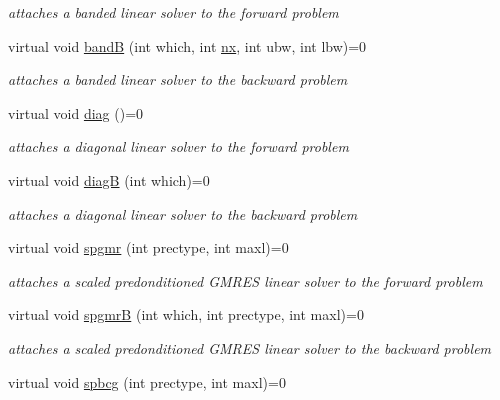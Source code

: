 \begin{DoxyCompactItemize}
\begin{DoxyCompactList}\small\item\em attaches a banded linear solver to the forward problem \end{DoxyCompactList}\item 
virtual void \mbox{\hyperlink{classamici_1_1_solver_a635908e6d209f02160e791f3ee9d0660}{bandB}} (int which, int \mbox{\hyperlink{classamici_1_1_solver_a86a18c4e461de76881b6af72e4feb8d9}{nx}}, int ubw, int lbw)=0
\begin{DoxyCompactList}\small\item\em attaches a banded linear solver to the backward problem \end{DoxyCompactList}\item 
\mbox{\label{classamici_1_1_solver_a8c82b886a5a8f4c33218e7345be700e2}} 
virtual void \mbox{\hyperlink{classamici_1_1_solver_a8c82b886a5a8f4c33218e7345be700e2}{diag}} ()=0
\begin{DoxyCompactList}\small\item\em attaches a diagonal linear solver to the forward problem \end{DoxyCompactList}\item 
virtual void \mbox{\hyperlink{classamici_1_1_solver_abaeb82c5ccd678c2c2ce3e4988704c24}{diagB}} (int which)=0
\begin{DoxyCompactList}\small\item\em attaches a diagonal linear solver to the backward problem \end{DoxyCompactList}\item 
virtual void \mbox{\hyperlink{classamici_1_1_solver_a41fd75dd5f9bc7363ca1c1079c2d0014}{spgmr}} (int prectype, int maxl)=0
\begin{DoxyCompactList}\small\item\em attaches a scaled predonditioned G\+M\+R\+ES linear solver to the forward problem \end{DoxyCompactList}\item 
virtual void \mbox{\hyperlink{classamici_1_1_solver_a466c88dd599259b83fe6140e7a454759}{spgmrB}} (int which, int prectype, int maxl)=0
\begin{DoxyCompactList}\small\item\em attaches a scaled predonditioned G\+M\+R\+ES linear solver to the backward problem \end{DoxyCompactList}\item 
virtual void \mbox{\hyperlink{classamici_1_1_solver_ace3159c84746c594a0fb6a5f00773c44}{spbcg}} (int prectype, int maxl)=0

\end{DoxyCompactItemize}
